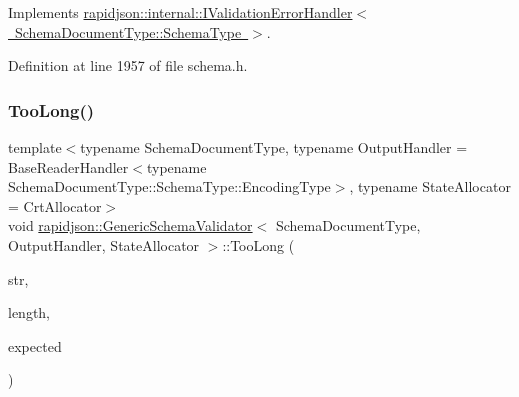 Implements \mbox{\hyperlink{classrapidjson_1_1internal_1_1_i_validation_error_handler_a7baac6bdae4e69e6fe187d4dbb9d27ed}{rapidjson\+::internal\+::\+I\+Validation\+Error\+Handler$<$ Schema\+Document\+Type\+::\+Schema\+Type $>$}}.



Definition at line 1957 of file schema.\+h.


\begin{DoxyCode}{0}

\end{DoxyCode}
\mbox{\label{classrapidjson_1_1_generic_schema_validator_a0acaa633e474a66d3739abde902f74d1}} 
\subsubsection{\texorpdfstring{TooLong()}{TooLong()}}
{\footnotesize\ttfamily template$<$typename Schema\+Document\+Type, typename Output\+Handler = Base\+Reader\+Handler$<$typename Schema\+Document\+Type\+::\+Schema\+Type\+::\+Encoding\+Type$>$, typename State\+Allocator = Crt\+Allocator$>$ \\
void \mbox{\hyperlink{classrapidjson_1_1_generic_schema_validator}{rapidjson\+::\+Generic\+Schema\+Validator}}$<$ Schema\+Document\+Type, Output\+Handler, State\+Allocator $>$\+::Too\+Long (\begin{DoxyParamCaption}\item[{const \mbox{\hyperlink{classrapidjson_1_1_generic_schema_validator_ab5b7093443e29cf66eb7cf47f3d8583d}{Ch}} $\ast$}]{str,  }\item[{\mbox{\hyperlink{namespacerapidjson_a44eb33eaa523e36d466b1ced64b85c84}{Size\+Type}}}]{length,  }\item[{\mbox{\hyperlink{namespacerapidjson_a44eb33eaa523e36d466b1ced64b85c84}{Size\+Type}}}]{expected }\end{DoxyParamCaption})}



